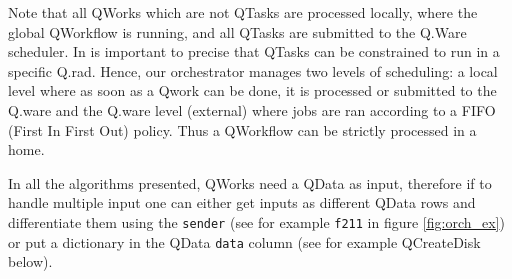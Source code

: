 \documentclass[10pt, conference, compsocconf]{IEEEtran}
\begin{document}
Note that all QWorks which are not QTasks are processed locally, where the global QWorkflow is running, and all QTasks are submitted to the Q.Ware scheduler. In is important to precise that QTasks can be constrained to run in a specific Q.rad. Hence, our orchestrator manages two levels of scheduling: a local level where as soon as a Qwork can be done, it is processed or submitted to the Q.ware and the Q.ware level (external) where jobs are ran according to a FIFO (First In First Out) policy. Thus a QWorkflow can be strictly processed in a home.

In all the algorithms presented, QWorks need a QData as input, therefore if to handle multiple input one can either get inputs as different QData rows and differentiate them using the \texttt{sender} (see for example \texttt{f211} in figure \ref{fig:orch_ex})
or put a dictionary in the QData \texttt{data} column (see for example QCreateDisk below).
\end{document}
